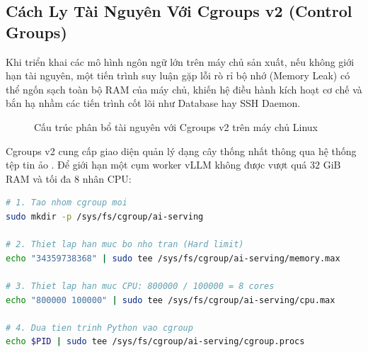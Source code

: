 \subsection{Cách Ly Tài Nguyên Với Cgroups v2 (Control Groups)}
Khi triển khai các mô hình ngôn ngữ lớn trên máy chủ sản xuất, nếu không giới hạn tài nguyên, một tiến trình suy luận gặp lỗi rò rỉ bộ nhớ (Memory Leak) có thể ngốn sạch toàn bộ RAM của máy chủ, khiến hệ điều hành kích hoạt cơ chế  và bắn hạ nhầm các tiến trình cốt lõi như Database hay SSH Daemon.

\begin{figure}[htbp]
\centering
{}
\caption{Cấu trúc phân bổ tài nguyên với Cgroups v2 trên máy chủ Linux}
\label{fig:cgroups-v2}
\end{figure}

Cgroups v2 cung cấp giao diện quản lý dạng cây thống nhất thông qua hệ thống tệp tin ảo . Để giới hạn một cụm worker vLLM không được vượt quá $32\text{ GiB}$ RAM và tối đa 8 nhân CPU:
\begin{lstlisting}[language=bash]
# 1. Tao nhom cgroup moi
sudo mkdir -p /sys/fs/cgroup/ai-serving

# 2. Thiet lap han muc bo nho tran (Hard limit)
echo "34359738368" | sudo tee /sys/fs/cgroup/ai-serving/memory.max

# 3. Thiet lap han muc CPU: 800000 / 100000 = 8 cores
echo "800000 100000" | sudo tee /sys/fs/cgroup/ai-serving/cpu.max

# 4. Dua tien trinh Python vao cgroup
echo $PID | sudo tee /sys/fs/cgroup/ai-serving/cgroup.procs
\end{lstlisting}

